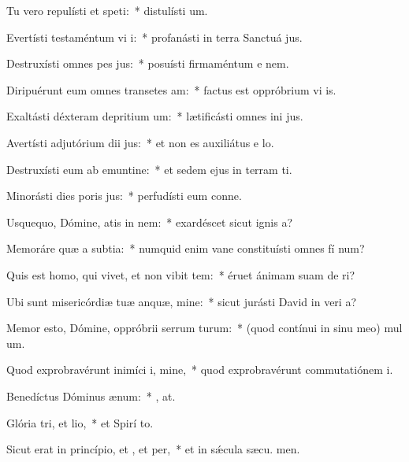 \item Tu vero repulísti et speti:~* distulísti  um.
\item Evertísti testaméntum vi i:~* profanásti in terra Sanctuá jus.
\item Destruxísti omnes pes jus:~* posuísti firmaméntum e nem.
\item Diripuérunt eum omnes transetes am:~* factus est oppróbrium vi is.
\item Exaltásti déxteram depritium um:~* lætificásti omnes ini jus.
\item Avertísti adjutórium dii jus:~* et non es auxiliátus e  lo.
\item Destruxísti eum ab emuntine:~* et sedem ejus in terram ti.
\item Minorásti dies poris jus:~* perfudísti eum conne.
\item Usquequo, Dómine, atis in nem:~* exardéscet sicut ignis  a?
\item Memoráre quæ a subtia:~* numquid enim vane constituísti omnes fí num?
\item Quis est homo, qui vivet, et non vibit tem:~* éruet ánimam suam de  ri?
\item Ubi sunt misericórdiæ tuæ anquæ, mine:~* sicut jurásti David in veri a?
\item Memor esto, Dómine, oppróbrii serrum turum:~* (quod contínui in sinu meo) mul um.
\item Quod exprobravérunt inimíci i, mine,~* quod exprobravérunt commutatiónem  i.
\item Benedíctus Dóminus  ænum:~* , at.
\item Glória tri, et lio,~* et Spirí to.
\item Sicut erat in princípio, et , et per,~* et in sǽcula sæcu. men.
